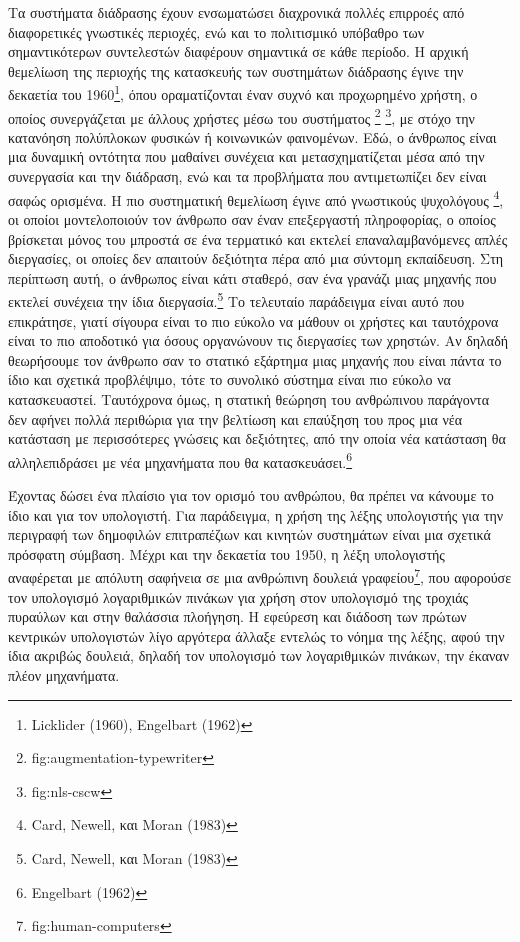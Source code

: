 \documentclass[
]{article}
\begin{document}
Τα συστήματα διάδρασης έχουν ενσωματώσει διαχρονικά πολλές επιρροές από
διαφορετικές γνωστικές περιοχές, ενώ και το πολιτισμικό υπόβαθρο των
σημαντικότερων συντελεστών διαφέρουν σημαντικά σε κάθε περίοδο. Η αρχική
θεμελίωση της περιοχής της κατασκευής των συστημάτων διάδρασης έγινε την
δεκαετία του 1960\footnote{Licklider (1960), Engelbart (1962)}, όπου
οραματίζονται έναν συχνό και προχωρημένο χρήστη, ο οποίος συνεργάζεται
με άλλους χρήστες μέσω του συστήματος \footnote{fig:augmentation-typewriter}
\footnote{fig:nls-cscw}, με στόχο την κατανόηση πολύπλοκων φυσικών ή
κοινωνικών φαινομένων. Εδώ, ο άνθρωπος είναι μια δυναμική οντότητα που
μαθαίνει συνέχεια και μετασχηματίζεται μέσα από την συνεργασία και την
διάδραση, ενώ και τα προβλήματα που αντιμετωπίζει δεν είναι σαφώς
ορισμένα. Η πιο συστηματική θεμελίωση έγινε από γνωστικούς ψυχολόγους
\footnote{Card, Newell, και Moran (1983)}, οι οποίοι μοντελοποιούν τον
άνθρωπο σαν έναν επεξεργαστή πληροφορίας, ο οποίος βρίσκεται μόνος του
μπροστά σε ένα τερματικό και εκτελεί επαναλαμβανόμενες απλές διεργασίες,
οι οποίες δεν απαιτούν δεξιότητα πέρα από μια σύντομη εκπαίδευση. Στη
περίπτωση αυτή, ο άνθρωπος είναι κάτι σταθερό, σαν ένα γρανάζι μιας
μηχανής που εκτελεί συνέχεια την ίδια διεργασία.\footnote{Card, Newell,
  και Moran (1983)} Το τελευταίο παράδειγμα είναι αυτό που επικράτησε,
γιατί σίγουρα είναι το πιο εύκολο να μάθουν οι χρήστες και ταυτόχρονα
είναι το πιο αποδοτικό για όσους οργανώνουν τις διεργασίες των χρηστών.
Αν δηλαδή θεωρήσουμε τον άνθρωπο σαν το στατικό εξάρτημα μιας μηχανής
που είναι πάντα το ίδιο και σχετικά προβλέψιμο, τότε το συνολικό σύστημα
είναι πιο εύκολο να κατασκευαστεί. Ταυτόχρονα όμως, η στατική θεώρηση
του ανθρώπινου παράγοντα δεν αφήνει πολλά περιθώρια για την βελτίωση και
επαύξηση του προς μια νέα κατάσταση με περισσότερες γνώσεις και
δεξιότητες, από την οποία νέα κατάσταση θα αλληλεπιδράσει με νέα
μηχανήματα που θα κατασκευάσει.\footnote{Engelbart (1962)}

Έχοντας δώσει ένα πλαίσιο για τον ορισμό του ανθρώπου, θα πρέπει να
κάνουμε το ίδιο και για τον υπολογιστή. Για παράδειγμα, η χρήση της
λέξης υπολογιστής για την περιγραφή των δημοφιλών επιτραπέζιων και
κινητών συστημάτων είναι μια σχετικά πρόσφατη σύμβαση. Μέχρι και την
δεκαετία του 1950, η λέξη υπολογιστής αναφέρεται με απόλυτη σαφήνεια σε
μια ανθρώπινη δουλειά γραφείου\footnote{fig:human-computers}, που
αφορούσε τον υπολογισμό λογαριθμικών πινάκων για χρήση στον υπολογισμό
της τροχιάς πυραύλων και στην θαλάσσια πλοήγηση. Η εφεύρεση και διάδοση
των πρώτων κεντρικών υπολογιστών λίγο αργότερα άλλαξε εντελώς το νόημα
της λέξης, αφού την ίδια ακριβώς δουλειά, δηλαδή τον υπολογισμό των
λογαριθμικών πινάκων, την έκαναν πλέον μηχανήματα.
\end{document}
